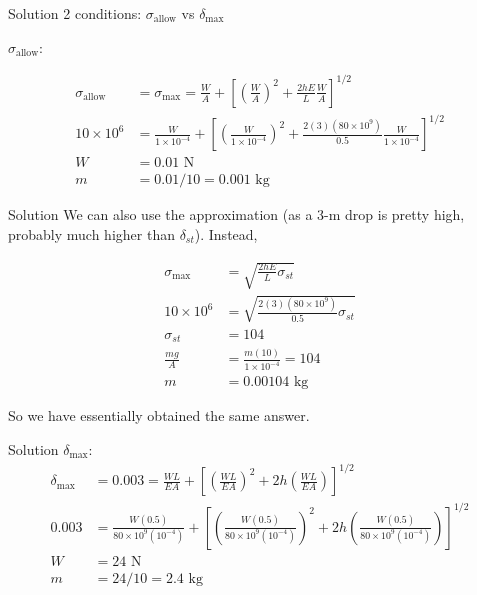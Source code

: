 \documentclass[10pt, svgnames]{beamer}
\begin{document}
\begin{frame}[label={sec:org3cb4a69}]{Solution}
2 conditions: \(\sigma_{\text{allow}}\) vs \(\delta_{\max}\)

\(\sigma_{\text{allow}}\):

\begin{align*}
    \sigma_{\text{allow}} &= \sigma_{\max} = \frac{W}{A} + \left[ \left( \frac{W}{A} \right)^{2} + \frac{2hE}{L}\frac{W}{A} \right]^{1/2} \\
    10 \times 10^{6} &= \frac{W}{1 \times 10^{-4}} + \left[ \left( \frac{W}{1 \times 10^{-4}} \right)^{2} + \frac{2(3)(80 \times 10^{9})}{0.5}\frac{W}{1 \times 10^{-4}} \right]^{1/2} \\
    W &= 0.01 \text{ N} \\
    m &= 0.01/10 = 0.001 \text{ kg}
\end{align*}
\end{frame}

\begin{frame}[label={sec:org6be933f}]{Solution}
We can also use the approximation (as a 3-m drop is pretty high, probably much higher than \(\delta_{st}\)). Instead,

\begin{align*}
    \sigma_{\max} &= \sqrt{\frac{2hE}{L} \sigma_{st}} \\
    10 \times 10^{6} &= \sqrt{\frac{2(3)(80 \times 10^{9})}{0.5}\sigma_{st}} \\
    \sigma_{st} &= 104 \\
    \frac{mg}{A} &= \frac{m(10)}{1 \times 10^{-4}} = 104 \\
    m &= 0.00104 \text{ kg}
\end{align*}

So we have essentially obtained the same answer.
\end{frame}

\begin{frame}[label={sec:org1fa0e16}]{Solution \(\delta_{\max}\):}
\begin{align*}
    \delta_{\max} &= 0.003 = \frac{WL}{EA} + \left[ \left( \frac{WL}{EA} \right)^{2} + 2h \left( \frac{WL}{EA} \right) \right]^{1/2} \\
    0.003 &= \frac{W(0.5)}{80 \times 10^{9}(10^{-4})} + \left[ \left( \frac{W(0.5)}{80 \times 10^{9}(10^{-4})} \right)^{2} + 2h \left(  \frac{W(0.5)}{80 \times 10^{9}(10^{-4})} \right) \right]^{1/2} \\
    W &= 24 \text{ N} \\
    m &= 24/10 = 2.4 \text{ kg}
\end{align*}
\end{frame}
\end{document}
